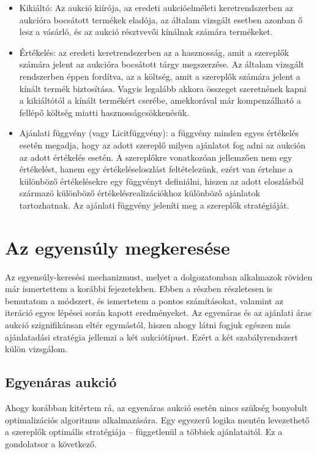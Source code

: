 \documentclass[twoside, magyar, showtrims]{corvinusphd}
\begin{document}
\begin{itemize}
    \item
    Kikiáltó: Az aukció kiírója, az eredeti aukcióelméleti keretrendszerben
az aukcióra bocsátott termékek eladója, az általam vizsgált esetben
azonban ő lesz a vásárló, és az aukció résztvevői kínálnak számára termékeket.
    \item
    Értékelés: az eredeti keretrendszerben az a hasznosság, amit a szereplők számára
jelent az aukcióra bocsátott tárgy megszerzése. Az általam vizsgált rendszerben éppen fordítva,
az a költség, amit a szereplők számára jelent a kínált termék biztosítása.
Vagyis legalább akkora összeget szeretnének kapni a kikiáltótól a kínált termékért cserébe,
amekkorával már kompenzálható a fellépő költség miatti hasznosságcsökkenésük.
    \item
    Ajánlati függvény (vagy Licitfüggvény): a függvény minden egyes értékelés esetén
megadja, hogy az adott szereplő milyen ajánlatot fog adni az aukción az adott értékelés esetén.
A szereplőkre vonatkozóan jellemzően nem egy értékelést, hanem egy értékeléseloszlást feltételezünk,
ezért van értelme a különböző értékelésekre egy függvényt definiálni, hiszen az adott eloszlásból
származó különböző értékelésrealizációkhoz különböző ajánlatok tartozhatnak.
Az ajánlati függvény jeleníti meg a szereplők stratégiáját.   
\end{itemize}

\chapter{Az egyensúly megkeresése}
\label{Nash}

\scwords Az egyensúly-keresési mechanizmust,
melyet a dolgozatomban alkalmazok
röviden már ismertettem a korábbi fejezetekben. Ebben a részben
részletesen is bemutatom a módszert, és ismertetem a pontos számításokat,
valamint az iteráció egyes lépései során kapott eredményeket.
Az egyenáras és az ajánlati áras aukció szignifikánsan eltér egymástól,
hiszen ahogy látni fogjuk egészen más ajánlatadási stratégia jellemzi a két aukciótípust.
Ezért a két szabályrendszert külön vizsgálom.

\section{Egyenáras aukció}\label{uniform}

Ahogy korábban kitértem rá, az egyenáras aukció esetén nincs szükség
bonyolult optimalizációs algoritmus alkalmazására. 
Egy egyszerű logika mentén levezethető a szereplők
optimális stratégiája -- függetlenül a többiek ajánlataitól.
Ez a gondolatsor a következő.
\end{document}
